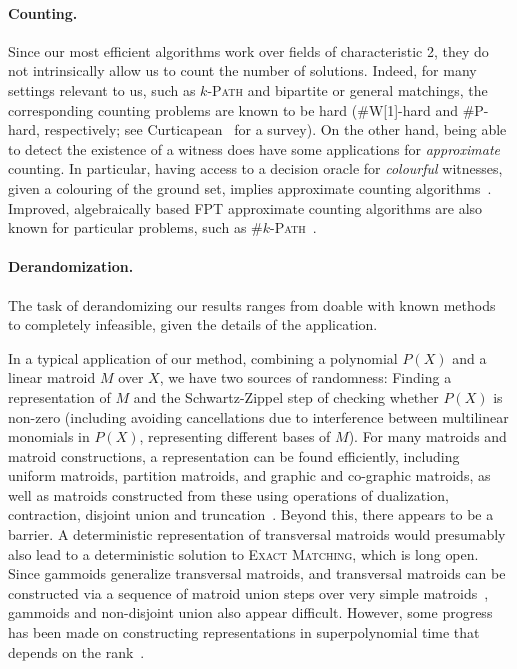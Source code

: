 \documentclass[10pt,a4paper]{article}
\begin{document}
\paragraph{Counting.} Since our most efficient algorithms work over
fields of characteristic 2, they do not intrinsically allow us to
count the number of solutions. Indeed, for many settings relevant
to us, such as \textsc{$k$-Path} and bipartite or general matchings,
the corresponding counting problems are known to be hard (\#W[1]-hard
and \#P-hard, respectively; see Curticapean~\cite{Curticapean18counting} for a survey). 
On the other hand, being able to detect the existence of a witness
does have some applications for \emph{approximate} counting.
In particular, having access to a decision oracle for
\emph{colourful} witnesses, given a colouring of the ground set,
implies approximate counting algorithms~\cite{BhattacharyaBGM22stacs,DellLM22counting,DellL21}.
Improved, algebraically based FPT approximate counting algorithms are
also known for particular problems, such as \textsc{\#$k$-Path}~\cite{LokshtanovBSZ21countkpath}.

\paragraph{Derandomization.} 
The task of derandomizing our results ranges from doable with known
methods to completely infeasible, given the details of the
application.

In a typical application of our method, 
combining a polynomial $P(X)$ and a linear matroid $M$ over $X$,
we have two sources of randomness: Finding a representation of $M$
and the Schwartz-Zippel step of checking whether $P(X)$ is non-zero
(including avoiding cancellations due to interference between 
multilinear monomials in $P(X)$, representing different bases of $M$).
For many matroids and matroid constructions, a representation can be
found efficiently, including uniform matroids, partition matroids, and
graphic and co-graphic matroids, as well as matroids constructed from
these using operations of dualization, contraction, disjoint union and
truncation~\cite{LokshtanovMPS18,OxleyBook,Marx09-matroid}. 
Beyond this, there appears to be a barrier. A deterministic
representation of transversal matroids would presumably also lead to a
deterministic solution to \textsc{Exact Matching}, which is long open. 
Since gammoids generalize transversal matroids, and transversal
matroids can be constructed via a sequence of matroid union steps
over very simple matroids~\cite{OxleyBook}, gammoids and non-disjoint union
also appear difficult. However, some progress has been made on
constructing representations in superpolynomial time that depends on
the rank~\cite{LokshtanovMP0Z18repr,MisraPR020repr}.
\end{document}
